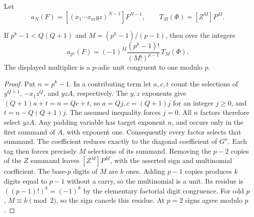 Let
\[
 a_N(F)=[(x_1\cdots x_myz)^{N-1}]F^{N-1},\qquad
 T_M(\Phi)=[Z^M]P^M.
\]
\begin{proposition}\label{prop:early-counting-coefficients}
If $p^k-1<Q(Q+1)$ and $M=(p^k-1)/(p-1)$, then over the integers
\[
 a_{p^k}(F)=(-1)^M
 \frac{(p^k-1)!}{(M!)^{p-1}}\,T_M(\Phi).
\]
The displayed multiplier is a $p$-adic unit congruent to one modulo $p$.
\end{proposition}
\begin{proof}
Put $n=p^k-1$. In a contributing term let $a,c,t$ count the selections of $y^{Q+1}$, $-x_1z^Q$, and $yzA$, respectively. The $y,z$ exponents give
$(Q+1)a+t=n=Qc+t$, so $a=Qj,c=(Q+1)j$ for an integer $j\geq0$, and $t=n-Q(Q+1)j$. The assumed inequality forces $j=0$. All $n$ factors therefore select $yzA$. Any padding variable has target exponent $n$, and occurs only in the first summand of $A$, with exponent one. Consequently every factor selects that summand. The coefficient reduces exactly to the diagonal coefficient of $G^n$.
Each tag then forces precisely $M$ selections of its summand. Removing the $p-2$ copies of the $Z$ summand leaves $[Z^M]P^M$, with the asserted sign and multinomial coefficient. The base-$p$ digits of $M$ are $k$ ones. Adding $p-1$ copies produces $k$ digits equal to $p-1$ without a carry, so the multinomial is a unit. Its residue is $((p-1)!)^k=(-1)^k$ by the elementary factorial digit congruence. For odd $p$, $M\equiv k\pmod2$, so the sign cancels this residue. At $p=2$ signs agree modulo $p$.
\end{proof}


